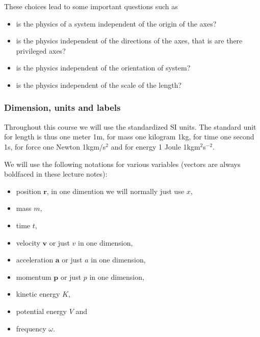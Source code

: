 \documentclass[letterpaper,10pt,english]{sphinxmanual}
\begin{document}
These choices lead to some important questions such as
\begin{itemize}
\item {} 
is the  physics of a system independent of the origin of the axes?

\item {} 
is the  physics independent of the directions of the axes, that is are there privileged axes?

\item {} 
is the physics independent of the orientation of system?

\item {} 
is the physics independent of the scale of the length?

\end{itemize}


\subsubsection{Dimension, units and labels}
\label{\detokenize{chapter2:dimension-units-and-labels}}
Throughout this course we will use the standardized SI units. The standard unit for length is thus one meter 1m, for mass
one kilogram 1kg, for time one second 1s, for force one Newton 1kgm/s\(^2\) and for energy 1 Joule 1kgm\(^2\)s\(^{-2}\).

We will use the following notations for various variables (vectors are always boldfaced in these lecture notes):
\begin{itemize}
\item {} 
position \(\boldsymbol{r}\), in one dimention we will normally just use \(x\),

\item {} 
mass \(m\),

\item {} 
time \(t\),

\item {} 
velocity \(\boldsymbol{v}\) or just \(v\) in one dimension,

\item {} 
acceleration \(\boldsymbol{a}\) or just \(a\) in one dimension,

\item {} 
momentum \(\boldsymbol{p}\) or just \(p\) in one dimension,

\item {} 
kinetic energy \(K\),

\item {} 
potential energy \(V\) and

\item {} 
frequency \(\omega\).

\end{itemize}
\end{document}
